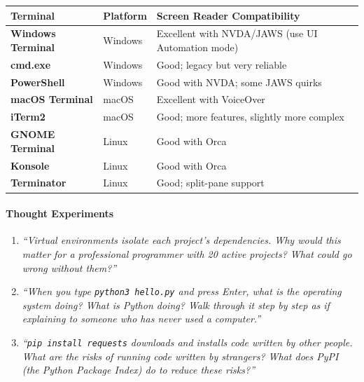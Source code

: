 \documentclass[
  justified,
  openright,
]{tufte-book}
\let\paragraph\paragraph
\let\paragraph\paragraph
\begin{document}
{\def\LTcaptype{none} %
\begin{longtable}[]{@{}
  >{\raggedright\arraybackslash}p{}
  >{\raggedright\arraybackslash}p{}
  >{\raggedright\arraybackslash}p{}@{}}
\toprule\noalign{}
\begin{minipage}[b]{\linewidth}\raggedright
Terminal
\end{minipage} & \begin{minipage}[b]{\linewidth}\raggedright
Platform
\end{minipage} & \begin{minipage}[b]{\linewidth}\raggedright
Screen Reader Compatibility
\end{minipage} \\
\midrule\noalign{}
\endhead
\bottomrule\noalign{}
\endlastfoot
\textbf{Windows Terminal} & Windows & Excellent with NVDA/JAWS (use UI
Automation mode) \\
\textbf{cmd.exe} & Windows & Good; legacy but very reliable \\
\textbf{PowerShell} & Windows & Good with NVDA; some JAWS quirks \\
\textbf{macOS Terminal} & macOS & Excellent with VoiceOver \\
\textbf{iTerm2} & macOS & Good; more features, slightly more complex \\
\textbf{GNOME Terminal} & Linux & Good with Orca \\
\textbf{Konsole} & Linux & Good with Orca \\
\textbf{Terminator} & Linux & Good; split-pane support \\
\end{longtable}
}

\paragraph{Thought Experiments}\label{thought-experiments-3}

\begin{enumerate}
\def\labelenumi{\arabic{enumi}.}
\item
  \emph{``Virtual environments isolate each project's dependencies. Why
  would this matter for a professional programmer with 20 active
  projects? What could go wrong without them?''}
\item
  \emph{``When you type \texttt{python3\ hello.py} and press Enter, what
  is the operating system doing? What is Python doing? Walk through it
  step by step as if explaining to someone who has never used a
  computer.''}
\item
  \emph{``\texttt{pip\ install\ requests} downloads and installs code
  written by other people. What are the risks of running code written by
  strangers? What does PyPI (the Python Package Index) do to reduce
  these risks?''}
\end{enumerate}
\end{document}
